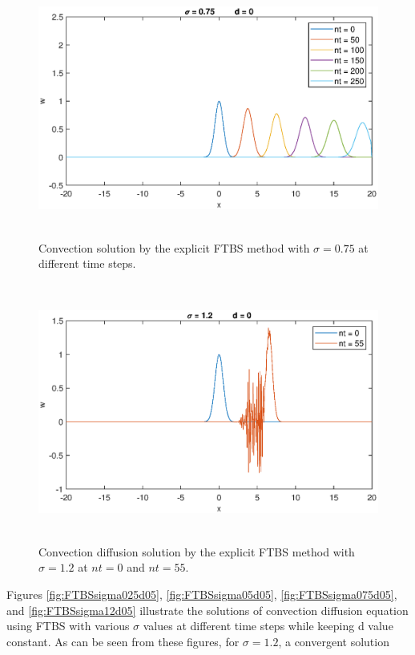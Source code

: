 \documentclass[letterpaper,12pt]{article}
\begin{document}
\newpage
\begin{figure}[!ht] 
	\centering 
	\includegraphics[max height=8.5cm]{graphs/FTBS/Convection/sigma075d0.eps}
	\caption{Convection solution by the explicit FTBS method with $\sigma= 0.75$ at different time steps.}
	 \label{fig:FTBSsigma075d0}
\end{figure}
\begin{figure}[!ht] 
	\centering 
	\includegraphics[max height=8.5cm]{graphs/FTBS/Convection/sigma12d0.eps}
	\caption{Convection diffusion solution by the explicit FTBS method with $\sigma= 1.2$ at $nt=0$ and $nt=55$.}
	 \label{fig:FTBSsigma12d0}
\end{figure}
\newpage
Figures \ref{fig:FTBSsigma025d05}, \ref{fig:FTBSsigma05d05}, \ref{fig:FTBSsigma075d05}, and \ref{fig:FTBSsigma12d05}
illustrate the solutions of convection diffusion equation using FTBS with various $\sigma$ values at different time
steps while keeping d value constant. As can be seen from these figures, for $\sigma = 1.2$, a convergent solution
\end{document}
